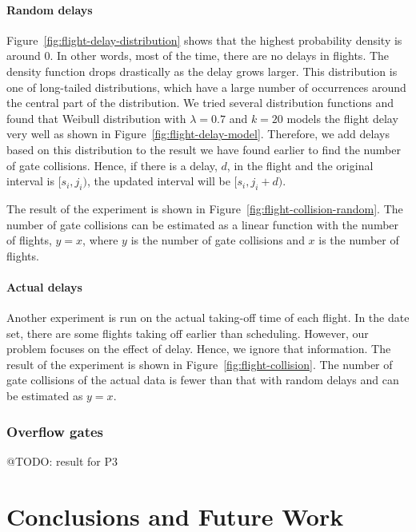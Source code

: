\documentclass[11pt,a4paper]{article}
\begin{document}
\paragraph{Random delays} Figure~\ref{fig:flight-delay-distribution} shows that the highest probability density is around 0. In other words, most of the time, there are no delays in flights. The density function drops drastically as the delay grows larger. This distribution is one of long-tailed distributions, which have a large number of occurrences around the central part of the distribution. We tried several distribution functions and found that Weibull distribution with $\lambda = 0.7$ and $k = 20$ models the flight delay very well as shown in Figure~\ref{fig:flight-delay-model}. Therefore, we add delays based on this distribution to the result we have found earlier to find the number of gate collisions. Hence, if there is a delay, $d$, in the flight and the original interval is $[s_i, j_i)$, the updated interval will be $[s_i, j_i+d)$. \par
The result of the experiment is shown in Figure~\ref{fig:flight-collision-random}. The number of gate collisions can be estimated as a linear function with the number of flights, $y = x$, where $y$ is the number of gate collisions and $x$ is the number of flights. \par
\paragraph{Actual delays} Another experiment is run on the actual taking-off time of each flight. In the date set, there are some flights taking off earlier than scheduling. However, our problem focuses on the effect of delay. Hence, we ignore that information. The result of the experiment is shown in Figure~\ref{fig:flight-collision}. The number of gate collisions of the actual data is fewer than that with random delays and can be estimated as $y = x$. \par

\subsubsection{Overflow gates}

@TODO: result for P3 

\section{Conclusions and Future Work}
\label{sec:conc}
\end{document}

